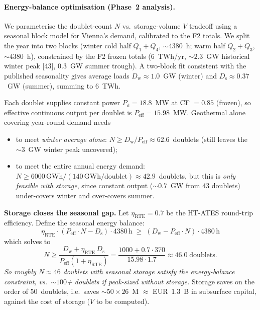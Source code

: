 \documentclass{article}
\begin{document}
\paragraph{Energy-balance optimisation (Phase~2 analysis).} We
parameterise the doublet-count $N$ vs.\ storage-volume $V$
tradeoff using a seasonal block model for Vienna's demand,
calibrated to the F2 totals. We split the year into two blocks
(winter cold half $Q_1+Q_4$, $\sim 4380$~h; warm half
$Q_2+Q_3$, $\sim 4380$~h), constrained by the F2 frozen totals
(6~TWh/yr, $\sim 2.3$~GW historical winter peak [43], 0.3~GW summer
trough). A two-block
fit consistent with the published seasonality gives average
loads $D_{\mathrm{w}}\approx 1.0$~GW (winter) and
$D_{\mathrm{s}}\approx 0.37$~GW (summer), summing to 6~TWh.

Each doublet supplies constant power $P_{\mathrm{d}} = 18.8$~MW at
CF $= 0.85$ (frozen), so effective continuous output per doublet is
$P_{\mathrm{eff}} = 15.98$~MW. Geothermal alone covering year-round
demand needs

\begin{itemize}
\item to meet \emph{winter average alone}: $N \geq D_{\mathrm{w}}
/ P_{\mathrm{eff}} \approx 62.6$~doublets (still leaves the
$\sim 3$~GW winter peak uncovered);
\item to meet the entire annual energy demand: $N \geq 6000\,\mathrm{GWh}
/ (140\,\mathrm{GWh/doublet}) \approx 42.9$~doublets, but this is
\emph{only feasible with storage}, since constant output
($\sim 0.7$~GW from 43 doublets) under-covers winter and
over-covers summer.
\end{itemize}

\textbf{Storage closes the seasonal gap.} Let $\eta_{\mathrm{RTE}}
= 0.7$ be the HT-ATES round-trip efficiency. Define the seasonal
energy balance:
\[
\eta_{\mathrm{RTE}} \cdot (P_{\mathrm{eff}} \cdot N - D_{\mathrm{s}}) \cdot
4380\,\mathrm{h}
\;\geq\;
(D_{\mathrm{w}} - P_{\mathrm{eff}} \cdot N) \cdot 4380\,\mathrm{h}
\]
which solves to
\[
N \geq \frac{D_{\mathrm{w}} + \eta_{\mathrm{RTE}}\, D_{\mathrm{s}}}
              {P_{\mathrm{eff}}(1 + \eta_{\mathrm{RTE}})}
       = \frac{1000 + 0.7 \cdot 370}{15.98 \cdot 1.7}
       \approx 46.0\;\mathrm{doublets.}
\]
\emph{So roughly $N \approx 46$ doublets with seasonal storage
satisfy the energy-balance constraint, vs.\ $\sim 100$+
doublets if peak-sized without storage.} Storage saves on the
order of 50~doublets, i.e.\ saves $\sim 50 \times 26$~M $\approx$
EUR~1.3~B in subsurface capital, against the cost of storage
($V$ to be computed).
\end{document}
